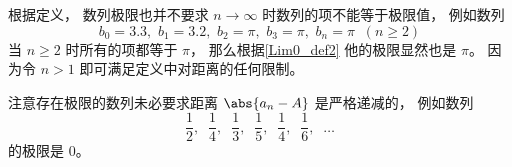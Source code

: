 \begin{example}{}
根据定义， 数列极限也并不要求 $n\to \infty$ 时数列的项不能等于极限值， 例如数列
\begin{equation}
b_0 = 3.3,\,\, b_1 = 3.2, \,\, b_2 = \pi, \,\, b_3 = \pi, \,\, b_n = \pi \;\; (n \ge 2)
\end{equation}
当 $n \ge 2$ 时所有的项都等于 $\pi$， 那么根据\autoref{Lim0_def2} 他的极限显然也是 $\pi$。 因为令 $n > 1$ 即可满足定义中对距离的任何限制。
\end{example}

\begin{example}{}
注意存在极限的数列未必要求距离 $\abs{a_n - A}$ 是严格递减的， 例如数列
\begin{equation}
\frac{1}{2},\;\; \frac{1}{4},\;\; \frac{1}{3},\;\; \frac{1}{5},\;\; \frac{1}{4},\;\; \frac{1}{6},\;\; \dots
\end{equation}
的极限是 $0$。
\end{example}
